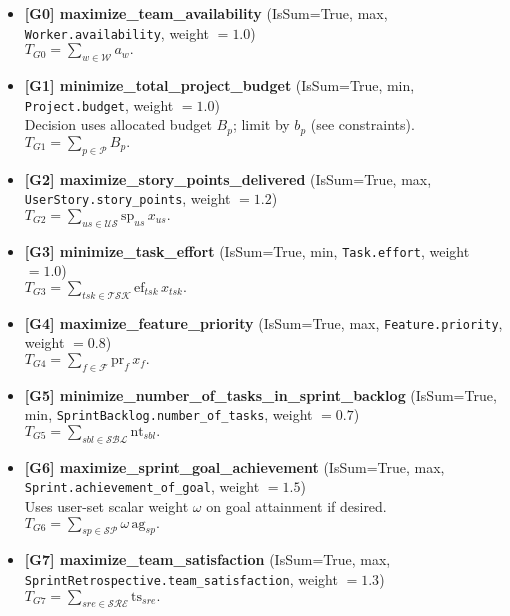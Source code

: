 \documentclass[11pt,a4paper]{article}
\begin{document}
\begin{itemize}[leftmargin=*]
  \item \textbf{[G0] maximize\_team\_availability} (IsSum=True, max, \texttt{Worker.availability}, weight $=1.0$)\\
  $T_{G0}=\displaystyle \sum_{w\in\mathcal{W}} a_w.$

  \item \textbf{[G1] minimize\_total\_project\_budget} (IsSum=True, min, \texttt{Project.budget}, weight $=1.0$)\\
  Decision uses allocated budget $B_p$; limit by $b_p$ (see constraints).\\
  $T_{G1}=\displaystyle \sum_{p\in\mathcal{P}} B_p.$

  \item \textbf{[G2] maximize\_story\_points\_delivered} (IsSum=True, max, \texttt{UserStory.story\_points}, weight $=1.2$)\\
  $T_{G2}=\displaystyle \sum_{us\in\mathcal{US}} \text{sp}_{us}\, x_{us}.$

  \item \textbf{[G3] minimize\_task\_effort} (IsSum=True, min, \texttt{Task.effort}, weight $=1.0$)\\
  $T_{G3}=\displaystyle \sum_{tsk\in\mathcal{TSK}} \text{ef}_{tsk}\, x_{tsk}.$

  \item \textbf{[G4] maximize\_feature\_priority} (IsSum=True, max, \texttt{Feature.priority}, weight $=0.8$)\\
  $T_{G4}=\displaystyle \sum_{f\in\mathcal{F}} \text{pr}_f\, x_f.$

  \item \textbf{[G5] minimize\_number\_of\_tasks\_in\_sprint\_backlog} (IsSum=True, min, \texttt{SprintBacklog.number\_of\_tasks}, weight $=0.7$)\\
  $T_{G5}=\displaystyle \sum_{sbl\in\mathcal{SBL}} \text{nt}_{sbl}.$

  \item \textbf{[G6] maximize\_sprint\_goal\_achievement} (IsSum=True, max, \texttt{Sprint.achievement\_of\_goal}, weight $=1.5$)\\
  Uses user-set scalar weight $\omega$ on goal attainment if desired.\\
  $T_{G6}=\displaystyle \sum_{sp\in\mathcal{SP}} \omega\, \text{ag}_{sp}.$

  \item \textbf{[G7] maximize\_team\_satisfaction} (IsSum=True, max, \texttt{SprintRetrospective.team\_satisfaction}, weight $=1.3$)\\
  $T_{G7}=\displaystyle \sum_{sre\in\mathcal{SRE}} \text{ts}_{sre}.$


\end{itemize}
\end{document}
